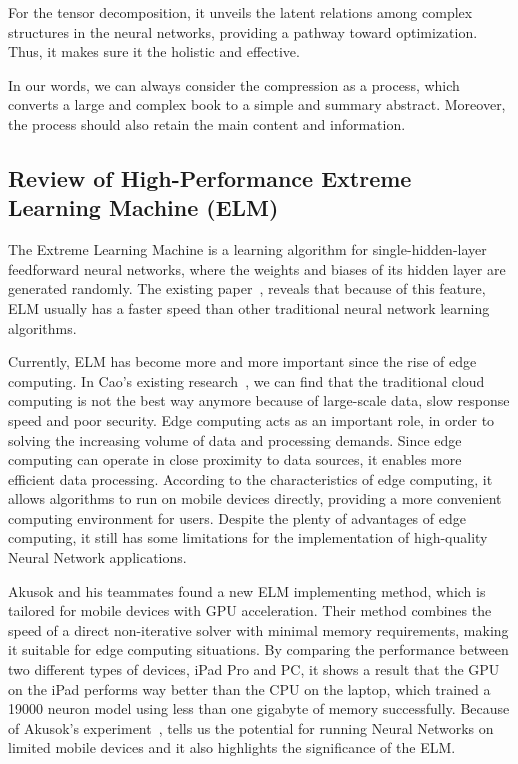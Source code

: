 \documentclass{article}
\begin{document}
For the tensor decomposition, it unveils the latent relations among complex structures in the neural networks, providing a pathway toward optimization. Thus, it makes sure it the holistic and effective.

In our words, we can always consider the compression as a process, which converts a large and complex book to a simple and summary abstract. Moreover, the process should also retain the main content and information.

\subsection{Review of High-Performance Extreme Learning Machine (ELM)}
The Extreme Learning Machine is a learning algorithm for single-hidden-layer feedforward neural networks, where the weights and biases of its hidden layer are generated randomly. The existing paper~\cite{akusok2019metal}, reveals that because of this feature, ELM usually has a faster speed than other traditional neural network learning algorithms. 

Currently, ELM has become more and more important since the rise of edge computing. In Cao’s existing research~\cite{cao2020edgecomputing}, we can find that the traditional cloud computing is not the best way anymore because of large-scale data, slow response speed and poor security. Edge computing acts as an important role, in order to solving the increasing volume of data and processing demands. Since edge computing can operate in close proximity to data sources, it enables more efficient data processing. According to the characteristics of edge computing, it allows algorithms to run on mobile devices directly, providing a more convenient computing environment for users. Despite the plenty of advantages of edge computing, it still has some limitations for the implementation of high-quality Neural Network applications.

Akusok and his teammates found a new ELM implementing method, which is tailored for mobile devices with GPU acceleration. Their method combines the speed of a direct non-iterative solver with minimal memory requirements, making it suitable for edge computing situations. By comparing the performance between two different types of devices, iPad Pro and PC, it shows a result that the GPU on the iPad performs way better than the CPU on the laptop, which trained a 19000 neuron model using less than one gigabyte of memory successfully. Because of Akusok’s experiment~\cite{akusok2019metal}, tells us the potential for running Neural Networks on limited mobile devices and it also highlights the significance of the ELM.
\end{document}
